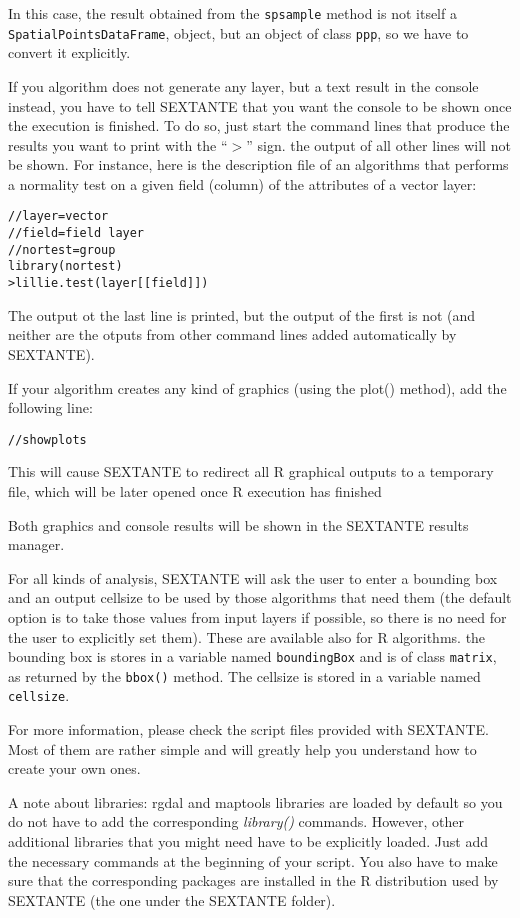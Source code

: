 In this case, the result obtained from the \texttt{spsample} method is not itself a \texttt{SpatialPointsDataFrame}, object, but an object of class \texttt{ppp}, so we have to convert it explicitly.

If you algorithm does not generate any layer, but a text result in the console instead, you have to tell SEXTANTE that you want the console to be shown once the execution is finished. To do so, just start the command lines that produce the results you want to print with the ``$>$'' sign. the output of all other lines will not be shown. For instance, here is the description file of an algorithms that performs a normality test on a given field (column) of the attributes of a vector layer:

\begin{verbatim}
//layer=vector
//field=field layer
//nortest=group
library(nortest)
>lillie.test(layer[[field]]) 	
\end{verbatim}

The output ot the last line is printed, but the output of the first is not (and neither are the otputs from other command lines added automatically by SEXTANTE).

If your algorithm creates any kind of graphics (using the plot() method), add the following line:

\begin{verbatim}
//showplots
\end{verbatim}

This will cause SEXTANTE to redirect all R graphical outputs to a temporary file, which will be later opened once R execution has finished

Both graphics and console results will be shown in the SEXTANTE results manager.

For all kinds of analysis, SEXTANTE will ask the user to enter a bounding box and an output cellsize to be used by those algorithms that need them (the default option is to take those values from input layers if possible, so there is no need for the user to explicitly set them). These are available also for R algorithms. the bounding box is stores in a variable named \texttt{boundingBox} and is of class \texttt{matrix}, as returned by the \texttt{bbox()} method. The cellsize is stored in a variable named \texttt{cellsize}.

For more information, please check the script files provided with SEXTANTE. Most of them are rather simple and will greatly help you understand how to create your own ones.

A note about libraries: rgdal and maptools libraries are loaded by default so you do not have to add the corresponding \emph{library()} commands. However, other additional libraries that you might need have to be explicitly loaded. Just add the necessary commands at the beginning of your script. You also have to make sure that the corresponding packages are installed in the R distribution used by SEXTANTE (the one under the SEXTANTE folder).










